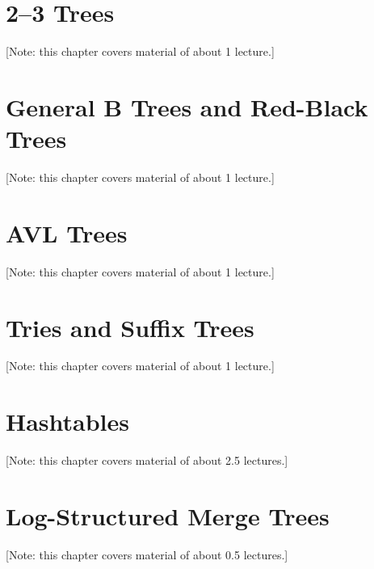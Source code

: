 \documentclass{book}
\begin{document}
\chapter{2--3 Trees}
\label{chap:B-trees}
[Note: this chapter covers material of about 1 lecture.]

%

\chapter{General B Trees and Red-Black Trees}
\label{chap:red-black-trees}
[Note: this chapter covers material of about 1 lecture.]

%

\chapter{AVL Trees}
\label{chap:AVL-trees}
[Note: this chapter covers material of about 1 lecture.]

%

\chapter{Tries and Suffix Trees}
\label{chap:tries}
[Note: this chapter covers material of about 1 lecture.]

%

\chapter{Hashtables}
\label{chap:hashing}
[Note: this chapter covers material of about 2.5 lectures.]

%

\chapter{Log-Structured Merge Trees}
\label{chap:LSM}
[Note: this chapter covers material of about 0.5 lectures.]
\end{document}
